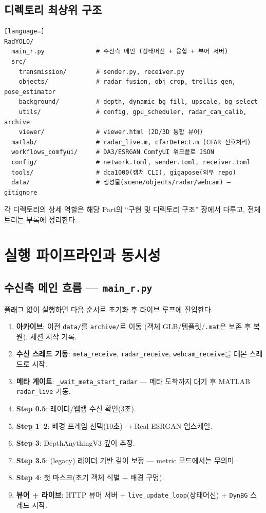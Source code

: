 \section{디렉토리 최상위 구조}
\begin{lstlisting}[language=]
RadYOLO/
  main_r.py              # 수신측 메인 (상태머신 + 융합 + 뷰어 서버)
  src/
    transmission/        # sender.py, receiver.py
    objects/             # radar_fusion, obj_crop, trellis_gen, pose_estimator
    background/          # depth, dynamic_bg_fill, upscale, bg_select
    utils/               # config, gpu_scheduler, radar_cam_calib, archive
    viewer/              # viewer.html (2D/3D 통합 뷰어)
  matlab/                # radar_live.m, cfarDetect.m (CFAR 신호처리)
  workflows_comfyui/     # DA3/ESRGAN ComfyUI 워크플로 JSON
  config/                # network.toml, sender.toml, receiver.toml
  tools/                 # dca1000(캡처 CLI), gigapose(외부 repo)
  data/                  # 생성물(scene/objects/radar/webcam) — gitignore
\end{lstlisting}
각 디렉토리의 상세 역할은 해당 Part의 ``구현 및 디렉토리 구조'' 장에서 다루고,
전체 트리는 부록에 정리한다.

\chapter{실행 파이프라인과 동시성}

\section{수신측 메인 흐름 — \texttt{main\_r.py}}
플래그 없이 실행하면 다음 순서로 초기화 후 라이브 루프에 진입한다.
\begin{enumerate}
  \item \textbf{아카이브}: 이전 \texttt{data/}를 \texttt{archive/}로 이동
        (객체 GLB/템플릿/\texttt{.mat}은 보존 후 복원). 세션 시작 기록.
  \item \textbf{수신 스레드 기동}: \texttt{meta\_receive}, \texttt{radar\_receive},
        \texttt{webcam\_receive}를 데몬 스레드로 시작.
  \item \textbf{메타 게이트}: \texttt{\_wait\_meta\_start\_radar} — 메타 도착까지 대기
        후 MATLAB \texttt{radar\_live} 기동.
  \item \textbf{Step 0.5}: 레이더/웹캠 수신 확인(3초).
  \item \textbf{Step 1--2}: 배경 프레임 선택(10초) → Real-ESRGAN 업스케일.
  \item \textbf{Step 3}: DepthAnythingV3 깊이 추정.
  \item \textbf{Step 3.5}: (legacy) 레이더 기반 깊이 보정 — metric 모드에서는 무의미.
  \item \textbf{Step 4}: 첫 마스크(초기 객체 식별 + 배경 구멍).
  \item \textbf{뷰어 + 라이브}: HTTP 뷰어 서버 + \texttt{live\_update\_loop}(상태머신) +
        \texttt{DynBG} 스레드 시작.
\end{enumerate}

